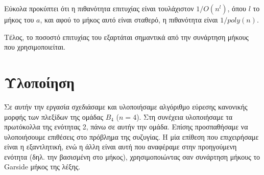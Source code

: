 Εύκολα προκύπτει ότι η πιθανότητα επιτυχίας είναι τουλάχιστον $ 1/O(n^l) $, όπου $ l$ το μήκος του $ a $, και αφού το μήκος αυτό είναι σταθερό, η πιθανότητα είναι $ 1/poly(n) $.

Τέλος, το ποσοστό επιτυχίας του εξαρτάται σημαντικά από την συνάρτηση μήκους που χρησιμοποιείται.




\section{Υλοποίηση}
Σε αυτήν την εργασία σχεδιάσαμε και υλοποιήσαμε αλγόριθμο εύρεσης κανονικής μορφής των πλεξίδων της ομάδας $B_4$
 ($n=4$). Στη συνέχεια υλοποιήσαμε τα πρωτόκολλα της ενότητας 2, πάνω σε αυτήν την ομάδα. Επίσης προσπαθήσαμε να υλοποιήσουμε επιθέσεις στο πρόβλημα της συζυγίας. Η μία επίθεση που επιχειρήσαμε είναι η εξαντλητική, ενώ η άλλη είναι αυτή που αναφέραμε στην προηγούμενη ενότητα (δηλ. την βασισμένη στο μήκος), χρησιμοποιώντας σαν συνάρτηση μήκους το Garside μήκος της λέξης. 

